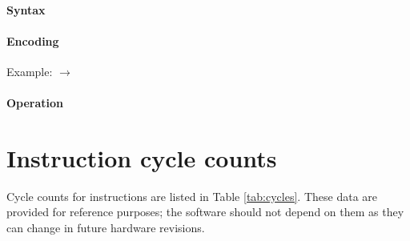 \documentclass[a4paper,12pt,twoside,extrafontsizes]{memoir}
\begin{document}
{\subsubsection{Syntax}


\subsubsection{Encoding}


Example:  $\rightarrow$ 

\subsubsection{Operation}


}


\chapter{Instruction cycle counts}

Cycle counts for \lxp{} instructions are listed in Table \ref{tab:cycles}. These data are provided for reference purposes; the software should not depend on them as they can change in future hardware revisions.
\end{document}
